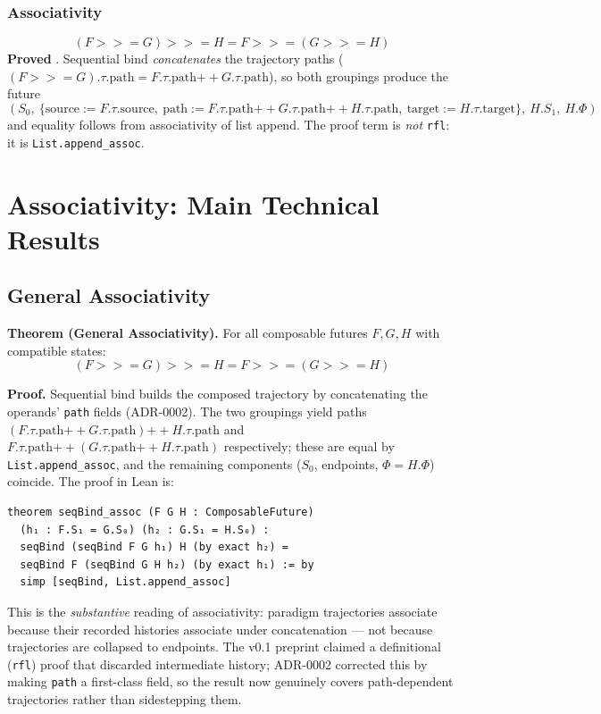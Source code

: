 \documentclass[11pt,a4paper]{article}
\newcommand{\seqBind}{\mathbin{>>=}}
\begin{document}
\subsubsection{Associativity}
\[
(F \seqBind G) \seqBind H = F \seqBind (G \seqBind H)
\]
\textbf{Proved} . Sequential bind
\emph{concatenates} the trajectory paths
($(F \seqBind G).\tau.\text{path} = F.\tau.\text{path} \mathbin{+\!\!+}
G.\tau.\text{path}$), so both groupings produce the future
\[
(S_0,\ \{\text{source} := F.\tau.\text{source},\
\text{path} := F.\tau.\text{path} \mathbin{+\!\!+} G.\tau.\text{path}
\mathbin{+\!\!+} H.\tau.\text{path},\
\text{target} := H.\tau.\text{target}\},\ H.S_1,\ H.\Phi)
\]
and equality follows from associativity of list append. The proof term is
\emph{not} \texttt{rfl}: it is \texttt{List.append\_assoc}.

\section{Associativity: Main Technical Results}\label{sec:assoc}

\subsection{General Associativity}

\textbf{Theorem (General Associativity).} For all composable futures $F, G, H$ with compatible states:
\[
(F \seqBind G) \seqBind H = F \seqBind (G \seqBind H)
\]

\textbf{Proof.} Sequential bind builds the composed trajectory by
concatenating the operands' \texttt{path} fields (ADR-0002). The two groupings
yield paths $(F.\tau.\text{path} \mathbin{+\!\!+} G.\tau.\text{path})
\mathbin{+\!\!+} H.\tau.\text{path}$ and $F.\tau.\text{path} \mathbin{+\!\!+}
(G.\tau.\text{path} \mathbin{+\!\!+} H.\tau.\text{path})$ respectively; these
are equal by \texttt{List.append\_assoc}, and the remaining components
($S_0$, endpoints, $\Phi = H.\Phi$) coincide. The proof in Lean is:
\begin{lstlisting}
theorem seqBind_assoc (F G H : ComposableFuture)
  (h₁ : F.S₁ = G.S₀) (h₂ : G.S₁ = H.S₀) :
  seqBind (seqBind F G h₁) H (by exact h₂) =
  seqBind F (seqBind G H h₂) (by exact h₁) := by
  simp [seqBind, List.append_assoc]
\end{lstlisting}

This is the \emph{substantive} reading of associativity: paradigm
trajectories associate because their recorded histories associate under
concatenation --- not because trajectories are collapsed to endpoints. The
v0.1 preprint claimed a definitional (\texttt{rfl}) proof that discarded
intermediate history; ADR-0002 corrected this by making \texttt{path} a
first-class field, so the result now genuinely covers path-dependent
trajectories rather than sidestepping them.
\end{document}

